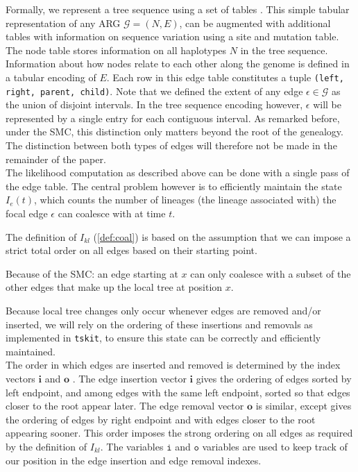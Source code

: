 \documentclass{article}
\begin{document}
Formally, we represent a tree sequence using a set of tables \citep{kelleher_efficient_2018}. 
This simple tabular representation of any ARG $\mathcal{G} = (N, E)$, can be 
augmented with additional tables with information on sequence variation
using a site and mutation table. The node table stores information on all 
haplotypes $N$ in the tree sequence. Information about how nodes relate to 
each other along the genome is defined in a tabular encoding of $E$.
Each row in this edge table constitutes a tuple \texttt{(left, right, parent, child)}.
Note that we defined the extent of any edge $\epsilon \in \mathcal{G}$ as the union of 
disjoint intervals. In the tree sequence encoding however, $\epsilon$ will be represented 
by a single entry for each contiguous interval. As remarked before, under the SMC, this 
distinction only matters beyond the root of the genealogy. The distinction between both 
types of edges will therefore not be made in the remainder of the paper.\\

The likelihood computation as described above can be done with a single pass 
of the edge table.
The central problem however is to efficiently maintain the state $I_e(t)$, which counts 
the number of lineages (the lineage associated with) the focal edge $\epsilon$ can coalesce 
with at time $t$. 


The definition of $I_{kl}$ (\ref{def:coal}) is based on the assumption 
that we can impose a strict total order on all edges based on their starting point.

Because of the SMC:
an edge starting at $x$ can only coalesce 
with a subset of the other edges that make up the local tree at position $x$.

Because local tree changes only occur whenever edges are removed and/or inserted,
we will rely on the ordering of these insertions and removals as implemented in
\texttt{tskit}, to ensure this state can be correctly and efficiently maintained.\\


The order in which edges are inserted and removed is determined by the index 
vectors $\textbf{i}$ and $\textbf{o}$ \citep{kelleher_efficient_2016}. The edge insertion vector 
$\textbf{i}$ gives the ordering of edges sorted by left endpoint, and among edges 
with the same left endpoint, sorted so that edges closer to the root appear later. 
The edge removal vector $\textbf{o}$ is similar, except gives the ordering of edges 
by right endpoint and with edges closer to the root appearing sooner. This order imposes the 
strong ordering on all edges as required by the definition of $I_{kl}$. The variables $\texttt{i}$ and 
$\texttt{o}$ variables are used to keep track of our position in the edge insertion and edge removal 
indexes.\\
\end{document}

